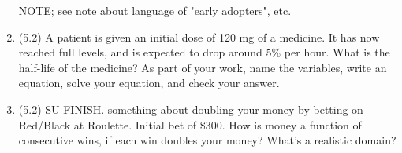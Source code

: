 \documentclass[12pt]{article}
\begin{document}
\begin{enumerate}
NOTE;  see note about language of "early adopters", etc.

\item (5.2) A patient is given an initial dose of 120 mg of a medicine.  It has now reached full levels, and is expected to drop around 5\% per hour.  What is the half-life of the medicine? As part of your work, name the variables, write an equation, solve your equation, and check your answer.

\item (5.2) SU FINISH.  something about doubling your money by betting on Red/Black at Roulette.  Initial bet of \$300.  How is money a function of consecutive wins, if each win doubles your money?  What's a realistic domain?



\end{enumerate}
\end{document}
